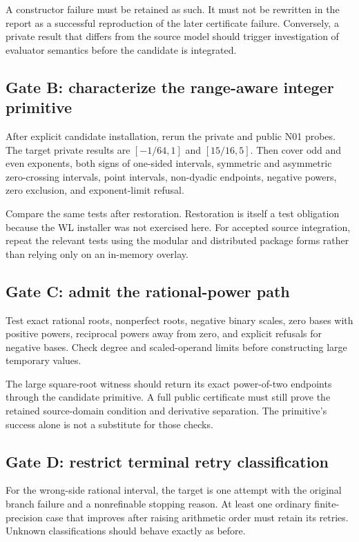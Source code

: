 \documentclass[11pt,a4paper]{article}
\begin{document}
A constructor failure must be retained as such. It must not be rewritten in the report as a successful reproduction of the later certificate failure. Conversely, a private result that differs from the source model should trigger investigation of evaluator semantics before the candidate is integrated.

\subsection{Gate B: characterize the range-aware integer primitive}

After explicit candidate installation, rerun the private and public N01 probes. The target private results are $[-1/64,1]$ and $[15/16,5]$. Then cover odd and even exponents, both signs of one-sided intervals, symmetric and asymmetric zero-crossing intervals, point intervals, non-dyadic endpoints, negative powers, zero exclusion, and exponent-limit refusal.

Compare the same tests after restoration. Restoration is itself a test obligation because the WL installer was not exercised here. For accepted source integration, repeat the relevant tests using the modular and distributed package forms rather than relying only on an in-memory overlay.

\subsection{Gate C: admit the rational-power path}

Test exact rational roots, nonperfect roots, negative binary scales, zero bases with positive powers, reciprocal powers away from zero, and explicit refusals for negative bases. Check degree and scaled-operand limits before constructing large temporary values.

The large square-root witness should return its exact power-of-two endpoints through the candidate primitive. A full public certificate must still prove the retained source-domain condition and derivative separation. The primitive's success alone is not a substitute for those checks.

\subsection{Gate D: restrict terminal retry classification}

For the wrong-side rational interval, the target is one attempt with the original branch failure and a nonrefinable stopping reason. At least one ordinary finite-precision case that improves after raising arithmetic order must retain its retries. Unknown classifications should behave exactly as before.
\end{document}
